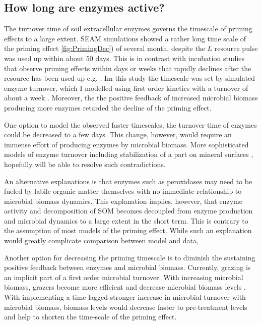 \subsection{How long are enzymes active?}
The turnover time of soil extracellular enzymes governs the timescale of priming
effects to a large extent. SEAM simulations showed a rather long time scale of
the priming effect \ref{fig:PrimingDec}) of several month, despite the $L$
resource pulse was used up within about 50 days. This is in contrast with
incubation studies that observe priming effects within days or weeks that
rapidly declines after the resource has been used up e.g.
\citep{Blagodatskaya14}.
Im this study the timescale was set by simulated enzyme turnover, which I
modelled using first order kinetics with a turnover of about a week
\citep{Burns13}. Moreover, the the positive feedback of increased microbial
biomass producing more enzymes retarded the decline of the priming effect.

One option to model the observed faster timescales, the turnover time of enzymes
could be decreased to a few days.
This change, however, would require an immense effort of producing enzymes by
microbial biomass. More sophisticated models of enzyme turnover
including stabilization of a part on mineral surfaces \citep{Burns13},
hopefully will be able to resolve such contradictions.

An alternative explanations is that enzymes such as peroxidases may need to be
fueled by labile organic matter themselves \citep{Rousk14} with no immediate
relationship to microbial biomass dynamics.
This explanation implies, however, that enzyme activity and decomposition of SOM
becomes decoupled from enzyme production and microbial dynamics to a large
extent in the short term.
This is contrary to the assumption of most models of the priming effect. While
such an explanation would greatly complicate comparison between model and data,

Another option for decreasing the priming timescale is to diminish the
sustaining positive feedback between enzymes and microbial biomass. Currently,
grazing is an implicit part of a first order microbial turnover. With increasing
microbial biomass, grazers become more efficient and decrease microbial biomass
levels \citep{Clarholm81}. With implementing a time-lagged stronger increase in
microbial turnover with microbial biomass, biomass levels would decrease faster
to pre-treatment levels and help to shorten the time-scale of the
priming effect.

